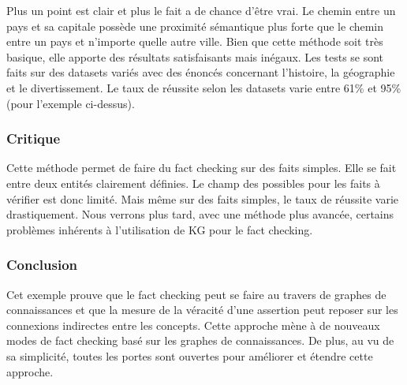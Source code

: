 Plus un point est clair et plus le fait a de chance d'être vrai. Le chemin entre un pays et sa capitale possède une proximité sémantique plus forte que le chemin entre un pays et n'importe quelle autre ville. Bien que cette méthode soit très basique, elle apporte des résultats satisfaisants mais inégaux. Les tests se sont faits sur des datasets variés avec des énoncés concernant l'histoire, la géographie et le divertissement. Le taux de réussite selon les datasets varie entre 61\% et 95\% (pour l'exemple ci-dessus). 

\subsubsection{Critique} Cette méthode permet de faire du fact checking sur des faits simples. Elle se fait entre deux entités clairement définies. Le champ des possibles pour les faits à vérifier est donc limité. Mais même sur des faits simples, le taux de réussite varie drastiquement.
Nous verrons plus tard, avec une méthode plus avancée, certains problèmes inhérents à l'utilisation de KG pour le fact checking.

\subsubsection{Conclusion}

Cet exemple prouve que le fact checking peut se faire au travers de graphes de connaissances et que la mesure de la véracité d'une assertion peut reposer sur les connexions indirectes entre les concepts. Cette approche mène à de nouveaux modes de fact checking basé sur les graphes de connaissances. De plus, au vu de sa simplicité, toutes les portes sont ouvertes pour améliorer et étendre cette approche.